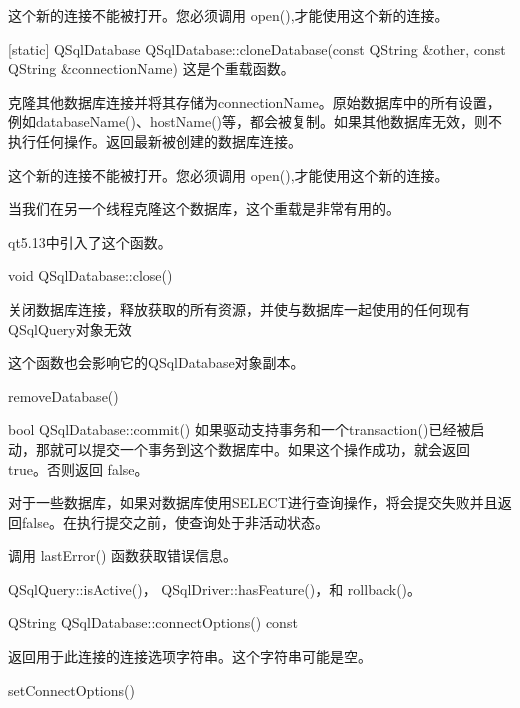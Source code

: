 \begin{notice}[警告]
这个新的连接不能被打开。您必须调用 open(),才能使用这个新的连接。
\end{notice}


[static] QSqlDatabase QSqlDatabase::cloneDatabase(const QString \&other, const QString \&connectionName)
这是个重载函数。

克隆其他数据库连接并将其存储为connectionName。原始数据库中的所有设置，例如databaseName()、hostName()等，都会被复制。如果其他数据库无效，则不执行任何操作。返回最新被创建的数据库连接。



\begin{notice}
这个新的连接不能被打开。您必须调用 open(),才能使用这个新的连接。
\end{notice}

当我们在另一个线程克隆这个数据库，这个重载是非常有用的。

qt5.13中引入了这个函数。

void QSqlDatabase::close()

关闭数据库连接，释放获取的所有资源，并使与数据库一起使用的任何现有QSqlQuery对象无效

这个函数也会影响它的QSqlDatabase对象副本。




\begin{notice}[另请参阅]
removeDatabase()
\end{notice}


bool QSqlDatabase::commit()
如果驱动支持事务和一个transaction()已经被启动，那就可以提交一个事务到这个数据库中。如果这个操作成功，就会返回 true。否则返回 false。


\begin{notice}
对于一些数据库，如果对数据库使用SELECT进行查询操作，将会提交失败并且返回false。在执行提交之前，使查询处于非活动状态。
\end{notice} 

调用 lastError() 函数获取错误信息。

\begin{notice}[另请参阅]
 QSqlQuery::isActive()， QSqlDriver::hasFeature()，和 rollback()。
\end{notice}


QString QSqlDatabase::connectOptions() const

返回用于此连接的连接选项字符串。这个字符串可能是空。


\begin{notice}[另请参阅]
setConnectOptions()
\end{notice}

